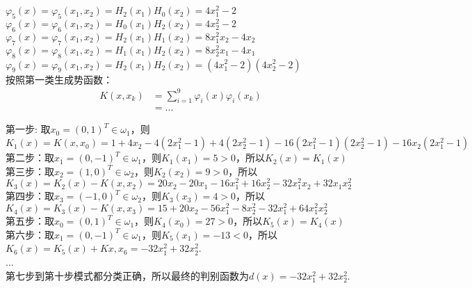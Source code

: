 \documentclass{article}
\begin{document}
\begin{CJK*}{UTF8}{gbsn}
    $\varphi_{5}(x) = \varphi_{5}(x_{1}, x_{2}) = H_{2}(x_{1})H_{0}(x_{2}) = 4x_{1}^{2}-2$ \\
    $\varphi_{6}(x) = \varphi_{6}(x_{1}, x_{2}) = H_{0}(x_{1})H_{2}(x_{2}) = 4x_{2}^{2}-2$ \\
    $\varphi_{7}(x) = \varphi_{7}(x_{1}, x_{2}) = H_{2}(x_{1})H_{1}(x_{2}) = 8x_{1}^{2}x_{2} - 4x_{2}$ \\
    $\varphi_{8}(x) = \varphi_{8}(x_{1}, x_{2}) = H_{1}(x_{1})H_{2}(x_{2}) = 8x_{2}^{2}x_{1} - 4x_{1}$ \\
    $\varphi_{9}(x) = \varphi_{9}(x_{1}, x_{2}) = H_{2}(x_{1})H_{2}(x_{2}) = (4x_{1}^{2}-2)(4x_{2}^{2}-2)$ \\
    按照第一类生成势函数：\\
    \begin{equation*}
    \begin{aligned}
        K(x, x_{k}) &= \sum_{i=1}^{9}\varphi_{i}(x)\varphi_{i}(x_{k}) \\
                    &= ...
    \end{aligned}
    \end{equation*}

    第一步: 取$x_{0}=(0, 1)^{T} \in \omega_{1}$，则$K_{1}(x) = K(x, x_{0}) = 1 + 4x_{2} -4(2x_{1}^{2}-1) + 4(2x_{2}^{2}-1) - 16(2x_{1}^{2}-1)(2x_{2}^{2}-1) - 16x_{2}(2x_{1}^{2}-1)$\\
    第二步：取$x_{1}=(0, -1)^{T} \in \omega_{1}$，则$K_{1}(x_{1})=5 > 0$，所以$K_{2}(x) = K_1(x)$\\
    第三步：取$x_{2}=(1, 0)^{T} \in \omega_{2}$，则$K_{2}(x_{2})=9 > 0$，所以$K_{3}(x) = K_{2}(x) - K(x, x_{2}) = 20x_{2}-20x_{1}-16x_{1}^{2}+16x_{2}^{2}-32x_{1}^{2}x_{2}+32x_{1}x_{2}^{2}$ \\
    第四步：取$x_{3}=(-1, 0)^{T} \in \omega_{2}$，则$K_{3}(x_{3})=4 > 0$，所以$K_{4}(x) = K_{3}(x) - K(x, x_{3}) = 15+20x_{2}-56x_{1}^{2}-8x_{2}^{2}-32x_{1}^{2}+64x_{1}^{2}x_{2}^{2}$ \\
    第五步：取$x_{0}=(0, 1)^{T} \in \omega_{1}$，则$K_{4}(x_{0}) = 27 > 0$，所以$K_5(x) = K_{4}(x)$ \\
    第六步：取$x_{1}=(0, -1)^{T} \in \omega_{1}$，则$K_{5}(x_{1})=-13 < 0$，所以$K_6(x) = K_5(x) + K{x, x_{6}} = -32x_{1}^{2} + 32x_{2}^{2}$. \\
    ...\\
    第七步到第十步模式都分类正确，所以最终的判别函数为$d(x)=-32x_{1}^{2}+32x_{2}^{2}$.


\end{CJK*}
\end{document}
